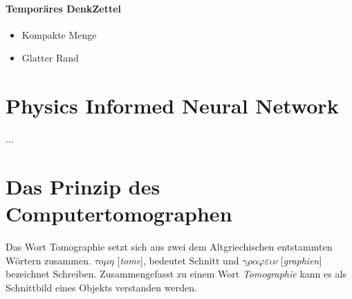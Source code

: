 \paragraph{Temporäres DenkZettel}

\begin{itemize}
	\item[] \begin{Definition}
		Kompakte Menge \\
		
	\end{Definition}
		\item[] \begin{Definition}
		Glatter Rand
	\end{Definition}
	
\end{itemize}


\section{Physics Informed Neural Network}

...

\section{Das Prinzip des Computertomographen}
\label{cha:1.1}

Das Wort Tomographie setzt sich aus zwei dem Altgriechischen entstammten Wörtern zusammen. $\tau o\mu\eta$ [\textit{tome}], bedeutet Schnitt und $\gamma\rho\alpha\varphi\varepsilon\iota\nu$ [\textit{graphien}] bezeichnet Schreiben. Zusammengefasst zu einem Wort \textit{Tomographie} kann es als Schnittbild eines Objekts verstanden werden. 

